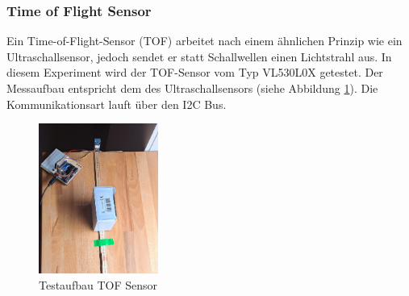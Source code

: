 \documentclass[../main.tex]{subfiles}
\begin{document}
\newpage
\subsubsection{Time of Flight Sensor}
Ein Time-of-Flight-Sensor (TOF) arbeitet nach einem ähnlichen Prinzip wie ein Ultraschallsensor, jedoch sendet er statt Schallwellen einen Lichtstrahl aus. In diesem Experiment wird der TOF-Sensor vom Typ VL530L0X getestet. Der Messaufbau entspricht dem des Ultraschallsensors (siehe Abbildung \ref{fig:TOF1}). Die Kommunikationsart lauft über den I2C Bus.

\begin{figure}[h!] %
    \centering
    \includegraphics[width=0.35\textwidth]{img/sensortest/MA_TOF.jpg} %
    \caption{Testaufbau TOF Sensor}
    \label{fig:TOF1} %
\end{figure}
\end{document}
